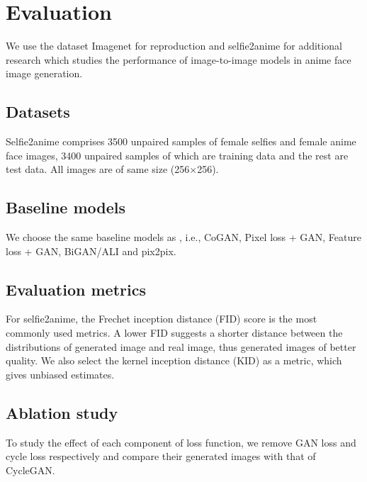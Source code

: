 \section{Evaluation}
We use the dataset Imagenet for reproduction and selfie2anime for additional research which studies the performance of image-to-image models in anime face image generation.

\subsection{Datasets}
Selfie2anime comprises 3500 unpaired samples of female selfies and female anime face images, 3400 unpaired samples of which are training data and the rest are test data. All images are of same size (256×256).

\subsection{Baseline models}
We choose the same baseline models as \cite{zhu_unpaired_2017}, i.e., CoGAN, Pixel loss + GAN, Feature loss + GAN, BiGAN/ALI and pix2pix.

\subsection{Evaluation metrics}
For selfie2anime, the Frechet inception distance (FID) score is the most commonly used metrics. A lower FID suggests a shorter distance between the distributions of generated image and real image, thus generated images of better quality\cite{sym12101705}. We also select the kernel inception distance (KID) as a metric, which gives unbiased estimates.

\subsection{Ablation study}
To study the effect of each component of loss function, we remove GAN loss and cycle loss respectively and compare their generated images with that of CycleGAN.